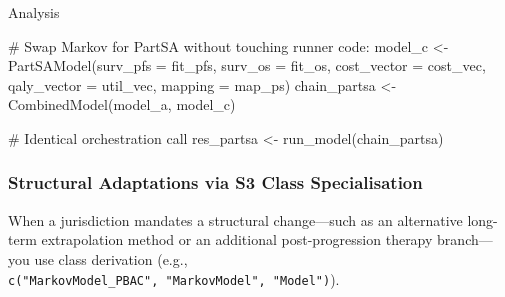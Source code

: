 \documentclass[
]{article}
\newenvironment{Shaded}{\begin{snugshade}}{\end{snugshade}}
\newcommand{\AttributeTok}[1]{\textcolor[rgb]{0.40,0.45,0.13}{#1}}
\newcommand{\CommentTok}[1]{\textcolor[rgb]{0.37,0.37,0.37}{#1}}
\newcommand{\FunctionTok}[1]{\textcolor[rgb]{0.28,0.35,0.67}{#1}}
\newcommand{\NormalTok}[1]{\textcolor[rgb]{0.00,0.23,0.31}{#1}}
\newcommand{\OtherTok}[1]{\textcolor[rgb]{0.00,0.23,0.31}{#1}}
\begin{document}
Analysis

\begin{Shaded}
\begin{Highlighting}[]
\CommentTok{\# Swap Markov for PartSA without touching runner code:}
\NormalTok{model\_c }\OtherTok{\textless{}{-}} \FunctionTok{PartSAModel}\NormalTok{(}\AttributeTok{surv\_pfs =}\NormalTok{ fit\_pfs, }\AttributeTok{surv\_os =}\NormalTok{ fit\_os, }
                       \AttributeTok{cost\_vector =}\NormalTok{ cost\_vec, }\AttributeTok{qaly\_vector =}\NormalTok{ util\_vec, }
                       \AttributeTok{mapping =}\NormalTok{ map\_ps)}
\NormalTok{chain\_partsa }\OtherTok{\textless{}{-}} \FunctionTok{CombinedModel}\NormalTok{(model\_a, model\_c)}

\CommentTok{\# Identical orchestration call}
\NormalTok{res\_partsa }\OtherTok{\textless{}{-}} \FunctionTok{run\_model}\NormalTok{(chain\_partsa)}
\end{Highlighting}
\end{Shaded}

\subsubsection{Structural Adaptations via S3 Class
Specialisation}\label{structural-adaptations-via-s3-class-specialisation}

When a jurisdiction mandates a structural change---such as an
alternative long-term extrapolation method or an additional
post-progression therapy branch---you use class derivation (e.g.,
\texttt{c("MarkovModel\_PBAC",\ "MarkovModel",\ "Model")}).
\end{document}
